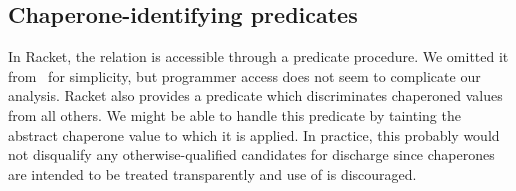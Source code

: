 
\subsection{Chaperone-identifying predicates}

In Racket, the  relation is accessible through a predicate procedure.
We omitted it from \chapcalc\ for simplicity, but programmer access does not seem to complicate our analysis.
Racket also provides a  predicate which discriminates chaperoned values from all others.
We might be able to handle this predicate by tainting the abstract chaperone value to which it is applied.
In practice, this probably would not disqualify any otherwise-qualified candidates for discharge since chaperones are intended to be treated transparently and use of  is discouraged.



